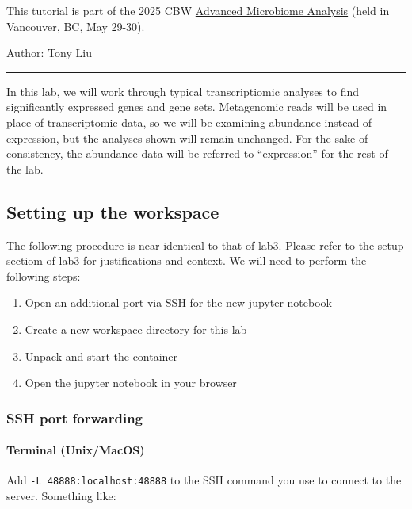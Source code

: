 \documentclass[
]{book}
\providecommand{\tightlist}{%
  \setlength{\itemsep}{0pt}\setlength{\parskip}{0pt}}
\begin{document}
This tutorial is part of the 2025 CBW \href{https://bioinformaticsdotca.github.io/AMB_2025/}{Advanced Microbiome Analysis} (held in Vancouver, BC, May 29-30).

Author: Tony Liu

\begin{center}\rule{0.5\linewidth}{0.5pt}\end{center}

In this lab, we will work through typical transcriptiomic analyses to find significantly expressed genes
and gene sets. Metagenomic reads will be used in place of transcriptomic data, so we will be examining
abundance instead of expression, but the analyses shown will remain unchanged.
For the sake of consistency, the abundance data will be referred to ``expression'' for the rest of the lab.

\subsection{Setting up the workspace}\label{setting-up-the-workspace-1}

The following procedure is near identical to that of lab3.
\href{module-3---lab-practical.html\#setting-up-the-workspace}{Please refer to the setup sectiom of lab3 for justifications and context.}
We will need to perform the following steps:

\begin{enumerate}
\def\labelenumi{\arabic{enumi}.}
\tightlist
\item
  Open an additional port via SSH for the new jupyter notebook
\item
  Create a new workspace directory for this lab
\item
  Unpack and start the container
\item
  Open the jupyter notebook in your browser
\end{enumerate}

\subsubsection{SSH port forwarding}\label{ssh-port-forwarding-1}

\paragraph{Terminal (Unix/MacOS)}\label{terminal-unixmacos-1}

Add \texttt{-L\ 48888:localhost:48888} to the SSH command you use to connect to the server. Something like:
\end{document}
